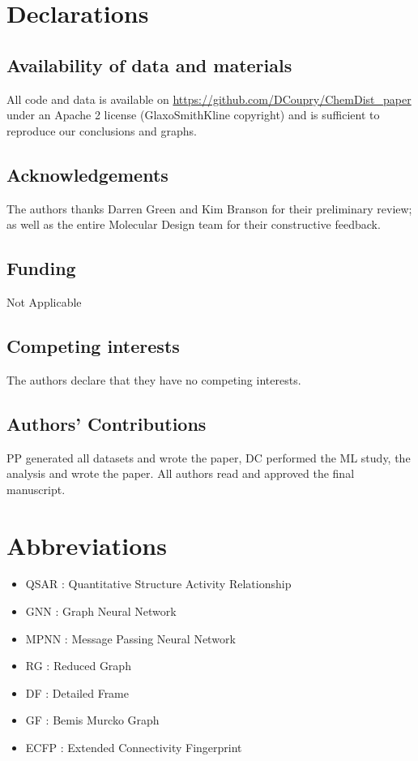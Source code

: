 \documentclass[doublespacing]{bmcart}
\begin{document}
\begin{backmatter}
\section{Declarations}
\subsection*{Availability of data and materials}
All code and data is available on \href{https://github.com/DCoupry/ChemDist_paper}{https://github.com/DCoupry/ChemDist\_paper} under an Apache 2 license (GlaxoSmithKline copyright) and is sufficient to reproduce our conclusions and graphs.

\subsection*{Acknowledgements}

The authors thanks Darren Green and Kim Branson for their preliminary review; as well as the entire Molecular Design team for their constructive feedback.

\subsection{Funding}
Not Applicable

\subsection*{Competing interests}
The authors declare that they have no competing interests.

\subsection{Authors' Contributions}
PP generated all datasets and wrote the paper, DC performed the ML study, the analysis and wrote the paper. All authors read and approved the final manuscript.

\section*{Abbreviations}
\begin{itemize}
    \item QSAR  : Quantitative Structure Activity Relationship
    \item GNN : Graph Neural Network
    \item MPNN : Message Passing Neural Network
    \item RG : Reduced Graph
    \item DF : Detailed Frame
    \item GF : Bemis Murcko Graph
    \item ECFP :  Extended Connectivity Fingerprint
\end{itemize}




\end{backmatter}
\end{document}
